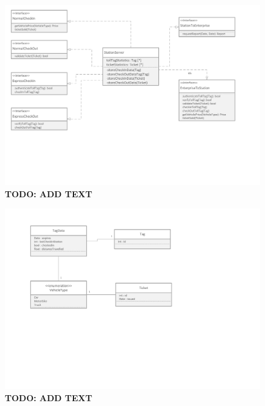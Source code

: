 \begin{figure}
\centerline{\includegraphics[width=\textwidth]{img/class_diagrams/class_diagram_station_server}}
\caption{\textbf{TODO: ADD TEXT}}
\label{fig:cld_ss}
\end{figure}

\begin{figure}
\centerline{\includegraphics[width=\textwidth]{img/class_diagrams/class_diagram_Tag_Ticket_VehicleType}}
\caption{\textbf{TODO: ADD TEXT}}
\label{fig:cld_ttvt}
\end{figure}

